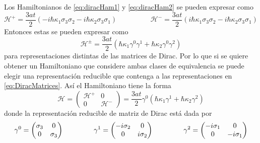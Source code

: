 Los Hamiltonianos de \eqref{eq:diracHam1} y \eqref{eq:diracHam2} se pueden expresar como
\begin{equation}
	\mathcal{H}^{+} = \frac{3at}{2}(-i\hbar\kappa_1\sigma_3\sigma_2 - i\hbar\kappa_2\sigma_3\sigma_1) \hspace{2cm}\mathcal{H}^{-} = \frac{3at}{2}(i\hbar\kappa_1\sigma_3\sigma_2 - i\hbar\kappa_2\sigma_3\sigma_1)
\end{equation}
Entonces estas se pueden expresar como
\begin{equation}
	\mathcal{H}^{\pm} = \frac{3at}{2}(\hbar\kappa_1 \gamma^0\gamma^1 + \hbar\kappa_2\gamma^0\gamma^2)
\end{equation}
para representaciones distintas de las matrices de Dirac. Por lo que si se quiere obtener un Hamiltoniano que considere ambas clases de equivalencia se puede elegir una representación reducible que contenga a las representaciones en \eqref{eq:DiracMatrices}. Así el Hamiltoniano tiene la forma
\begin{equation}
	\nonumber \mathcal{H}  = \begin{pmatrix}
		\mathcal{H}^{+} & 0               \\
		0               & \mathcal{H}^{-}
	\end{pmatrix} = \frac{3at}{2}\gamma^0(\hbar\kappa_1\gamma^1+ \hbar\kappa_2 \gamma^2)\label{eq:hamilMonGraph1}
\end{equation}
donde la representación reducible de matriz de Dirac está dada por
\begin{equation}
	\gamma^0= \begin{pmatrix}
		\sigma_3 & 0        \\
		0        & \sigma_3
	\end{pmatrix}\hspace{1.5cm}\gamma^1 = \begin{pmatrix}
		-i\sigma_2 & 0         \\
		0          & i\sigma_2
	\end{pmatrix}\hspace{1.5cm} \gamma^2 = \begin{pmatrix}
		-i\sigma_1 & 0          \\
		0          & -i\sigma_1
	\end{pmatrix}\label{eq:reducDirac}
\end{equation}
